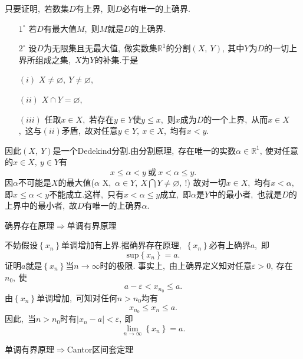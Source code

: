 \begin{solution}
	只要证明,\ 若数集$D$有上界,\ 则$D$必有唯一的上确界.
	\begin{itemize}
		\item[$1^\circ$] 若$D$有最大值$M$,\ 则$M$就是$D$的上确界.
		\item[$2^\circ$] 设$D$为无限集且无最大值,\ 做实数集$\mathbb{R}^1$的分割$\left(X,\ Y\right),\ $其中$Y$为$D$的一切上界所组成之集,\ $X$为$Y$的补集.于是
		\item[$\left(i\right)$] $X\neq\varnothing,\ Y\neq\varnothing$,\ 
		\item[$\left(ii\right)$] $X\cap Y = \varnothing$,\ 
		\item[$\left(iii\right)$] 任取$x \in X$,\ 若存在$y \in Y$使$y\le x$,\ 则$x$成为$D$的一个上界,\ 从而$x\in X$,\ 这与$\left(ii\right)$矛盾,\ 故对任意$y\in Y,\ x\in X$,\ 均有$x<y$.
	\end{itemize}
	因此$\left(X,\ Y\right)$是一个Dedekind分割.由分割原理,\ 存在唯一的实数$\alpha \in \mathbb{R}^1,\ $使对任意的$x\in X,\ y \in Y$有$$x\le \alpha < y\ \text{或}\ x < \alpha \le y.$$
	因$\alpha$不可能是$X$的最大值($\alpha$ X,\ $\alpha \in Y,\ $$X \bigcap Y \neq \varnothing,\ $!)
	故对一切$x\in X$,\ 均有$x<\alpha,\ $即$x\le \alpha  < y$不能成立.这样,\ 只有$x<\alpha \le y$成立,\ 即$\alpha$是$Y$中的最小者,\ 也就是$D$的上界中的最小者,\ 故$D$有唯一的上确界$\alpha$. 
\end{solution}
\newpage
\begin{problem}
	确界存在原理$\Rightarrow$单调有界原理
\end{problem}

\begin{solution}
	不妨假设$\left\{x_n\right\}$单调增加有上界.据确界存在原理,\ $\left\{x_n\right\}$必有上确界$a$,\ 即
	$$\text{sup}\left\{x_n\right\}=a.$$
	证明$a$就是$\left\{x_n\right\}$当$n\rightarrow\infty$时的极限.
	事实上,\ 由上确界定义知对任意$\varepsilon>0,\ $存在$n_0,\ $使$$a-\varepsilon<x_{n_0}\le a.$$
	由$\left\{x_n\right\}$单调增加,\ 可知对任何$n>n_0$均有$$x_{n_0}\le x_n \le a.$$
	因此,\ 当$n>n_0$时有$|x_n - a|<\varepsilon,\ $即
	$$\lim\limits_{n\rightarrow\infty}\left\{x_n\right\}=a.$$ 
\end{solution}
\newpage
\begin{problem}
	单调有界原理$\Rightarrow$Cantor区间套定理
\end{problem}

